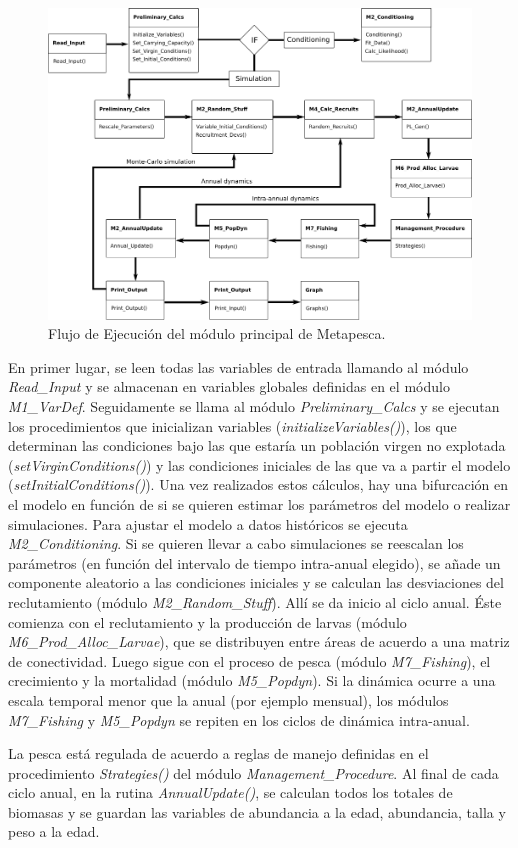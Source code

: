 \documentclass[12pt, oneside, a4paper]{article}
\begin{document}
		\begin{figure}[htb]
		\begin{center}
			\includegraphics[width=\textwidth]{DiagramaMetapesca.png}
		\caption{Flujo de Ejecución del módulo principal de Metapesca.}
		\label{fig:FlujoEjecucion}
		\end{center}
		\end{figure}

		En primer lugar, se leen todas las variables de entrada llamando al módulo \emph{Read\_Input} y se almacenan en variables globales definidas en el módulo \emph{M1\_VarDef}. 
		Seguidamente se llama al módulo \emph{Preliminary\_Calcs} y se ejecutan los procedimientos que inicializan variables (\emph{initializeVariables()}), los que determinan las condiciones bajo las que estaría un población virgen no explotada (\emph{setVirginConditions()}) y las condiciones iniciales de las que va a partir el modelo (\emph{setInitialConditions()}). 
		Una vez realizados estos cálculos, hay una bifurcación en el modelo en función de si se quieren estimar los parámetros del modelo o realizar simulaciones. 
		Para ajustar el modelo a datos históricos se ejecuta \emph{M2\_Conditioning}. 
		Si se quieren llevar a cabo simulaciones se reescalan los parámetros (en función del intervalo de tiempo intra-anual elegido), se añade un componente aleatorio a las condiciones iniciales y se calculan las desviaciones del reclutamiento (módulo \emph{M2\_Random\_Stuff}). Allí se da inicio al ciclo anual. Éste comienza con el reclutamiento y la producción de larvas (módulo \emph{M6\_Prod\_Alloc\_Larvae}), que se distribuyen entre áreas de acuerdo a una matriz de conectividad. Luego sigue con el proceso de pesca (módulo \emph{M7\_Fishing}), el crecimiento y la mortalidad (módulo \emph{M5\_Popdyn}). Si la dinámica ocurre a una escala temporal menor que la anual (por ejemplo mensual), los módulos \emph{M7\_Fishing} y \emph{M5\_Popdyn} se repiten en los ciclos de dinámica intra-anual. 
		\par La pesca está regulada de acuerdo a reglas de manejo definidas en el procedimiento \emph{Strategies()} del módulo \emph{Management\_Procedure}.   
		Al final de cada ciclo anual, en la rutina \emph{AnnualUpdate()}, se calculan todos los totales de biomasas y se guardan las variables de abundancia a la edad, abundancia, talla y peso a la edad. 
\end{document}
